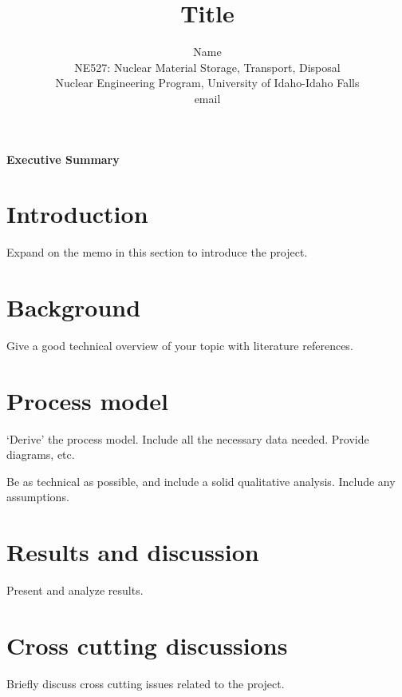 \documentclass[11pt,a4paper]{article}
\begin{document}
\begin{titlepage}
    \title{Title}
    \author{
        Name \\
        NE527: Nuclear Material Storage, Transport, Disposal\\
        Nuclear Engineering Program, University of Idaho-Idaho Falls \\
        email 
    }
\clearpage %
\maketitle
\thispagestyle{empty} %
\end{titlepage}

\onehalfspacing
\linenumbers
\pagewiselinenumbers
\modulolinenumbers[3] %

\noindent\Large{\textbf{Executive Summary}} \\

\newpage

\section{Introduction}
Expand on the memo in this section to introduce the project.

\newpage

\section{Background}
Give a good technical overview of your topic with literature references.

\newpage

\section{Process model}
‘Derive’ the process model. Include all the necessary data needed. Provide diagrams, etc.

Be as technical as possible, and include a solid qualitative analysis. Include any assumptions.

\newpage

\section{Results and discussion}
Present and analyze results.

\newpage

\section{Cross cutting discussions}
Briefly discuss cross cutting issues related to the project.
\end{document}
